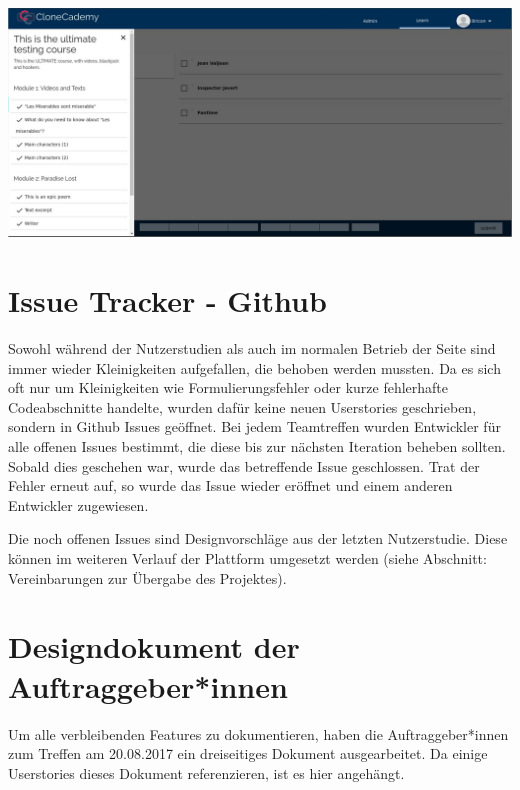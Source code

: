 \documentclass[accentcolor=tud0b,12pt,paper=a4]{tudreport}
\begin{document}
	\includegraphics[height=0.3\textheight]{appendix/screenshots/question-0.jpeg}


\chapter{Issue Tracker - Github}
Sowohl während der Nutzerstudien als auch im normalen Betrieb der Seite sind immer wieder Kleinigkeiten aufgefallen, die behoben werden mussten. Da es sich oft nur um Kleinigkeiten wie Formulierungsfehler oder kurze fehlerhafte Codeabschnitte handelte, wurden dafür keine neuen Userstories geschrieben, sondern in Github Issues geöffnet. Bei jedem Teamtreffen wurden Entwickler für alle offenen Issues bestimmt, die diese bis zur nächsten Iteration beheben sollten. Sobald dies geschehen war, wurde das betreffende Issue geschlossen. Trat der Fehler erneut auf, so wurde das Issue wieder eröffnet und einem anderen Entwickler zugewiesen.

Die noch offenen Issues sind Designvorschläge aus der letzten Nutzerstudie. Diese können im weiteren Verlauf der Plattform umgesetzt werden (siehe Abschnitt: Vereinbarungen zur Übergabe des Projektes).

	
	
	


\chapter{Designdokument der Auftraggeber*innen}
	Um alle verbleibenden Features zu dokumentieren, haben die Auftraggeber*innen zum Treffen am 20.08.2017 ein dreiseitiges Dokument ausgearbeitet. Da einige Userstories dieses Dokument referenzieren, ist es hier angehängt.
	
\end{document}
